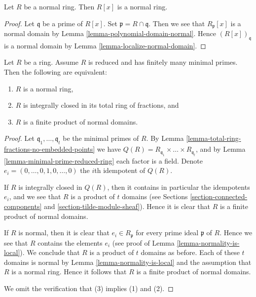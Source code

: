 \begin{lemma}
\label{lemma-polynomial-ring-normal}
Let $R$ be a normal ring. Then $R[x]$ is a normal ring.
\end{lemma}

\begin{proof}
Let $\mathfrak q$ be a prime of $R[x]$. Set $\mathfrak p = R \cap \mathfrak q$.
Then we see that $R_{\mathfrak p}[x]$ is a normal domain by
Lemma \ref{lemma-polynomial-domain-normal}.
Hence $(R[x])_{\mathfrak q}$ is a normal domain by
Lemma \ref{lemma-localize-normal-domain}.
\end{proof}

\begin{lemma}
\label{lemma-characterize-reduced-ring-normal}
Let $R$ be a ring. Assume $R$ is reduced and has finitely many
minimal primes. Then the following are equivalent:
\begin{enumerate}
\item $R$ is a normal ring,
\item $R$ is integrally closed in its total ring of fractions, and
\item $R$ is a finite product of normal domains.
\end{enumerate}
\end{lemma}

\begin{proof}
Let $\mathfrak q_1, \ldots, \mathfrak q_t$ be the minimal primes of $R$.
By Lemma \ref{lemma-total-ring-fractions-no-embedded-points} we have
$Q(R) = R_{\mathfrak q_1} \times \ldots \times R_{\mathfrak q_t}$, and
by Lemma \ref{lemma-minimal-prime-reduced-ring} each factor is a field.
Denote $e_i = (0, \ldots, 0, 1, 0, \ldots, 0)$ the $i$th idempotent
of $Q(R)$.

\medskip\noindent
If $R$ is integrally closed in $Q(R)$, then it contains in particular
the idempotents $e_i$, and we see
that $R$ is a product of $t$ domains (see
Sections \ref{section-connected-components} and
\ref{section-tilde-module-sheaf}). Hence it is clear that $R$ is
a finite product of normal domains.

\medskip\noindent
If $R$ is normal, then it is clear that $e_i \in R_{\mathfrak p}$
for every prime ideal $\mathfrak p$ of $R$. Hence we see that $R$
contains the elements $e_i$ (see proof of
Lemma \ref{lemma-normality-is-local}). We conclude
that $R$ is a product of $t$ domains as before. 
Each of these $t$ domains is normal by Lemma \ref{lemma-normality-is-local}
and the assumption that $R$ is a normal ring.
Hence it follows that $R$ is a finite product of normal domains.

\medskip\noindent
We omit the verification that (3) implies (1) and (2).
\end{proof}

